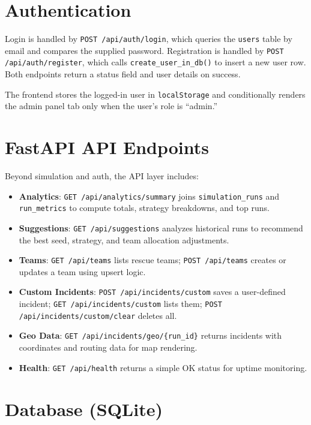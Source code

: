 \section{Authentication}
\label{sec:impl_auth}

Login is handled by \texttt{POST /api/auth/login}, which queries the \texttt{users} table by email and compares the supplied password. Registration is handled by \texttt{POST /api/auth/register}, which calls \texttt{create\_user\_in\_db()} to insert a new user row. Both endpoints return a status field and user details on success.

The frontend stores the logged-in user in \texttt{localStorage} and conditionally renders the admin panel tab only when the user's role is ``admin.''

\section{FastAPI API Endpoints}
\label{sec:impl_api}

Beyond simulation and auth, the API layer includes:

\begin{itemize}[leftmargin=*]
    \item \textbf{Analytics}: \texttt{GET /api/analytics/summary} joins \texttt{simulation\_runs} and \texttt{run\_metrics} to compute totals, strategy breakdowns, and top runs.
    \item \textbf{Suggestions}: \texttt{GET /api/suggestions} analyzes historical runs to recommend the best seed, strategy, and team allocation adjustments.
    \item \textbf{Teams}: \texttt{GET /api/teams} lists rescue teams; \texttt{POST /api/teams} creates or updates a team using upsert logic.
    \item \textbf{Custom Incidents}: \texttt{POST /api/incidents/custom} saves a user-defined incident; \texttt{GET /api/incidents/custom} lists them; \texttt{POST /api/incidents/custom/clear} deletes all.
    \item \textbf{Geo Data}: \texttt{GET /api/incidents/geo/\{run\_id\}} returns incidents with coordinates and routing data for map rendering.
    \item \textbf{Health}: \texttt{GET /api/health} returns a simple OK status for uptime monitoring.
\end{itemize}

\section{Database (SQLite)}
\label{sec:impl_database}

